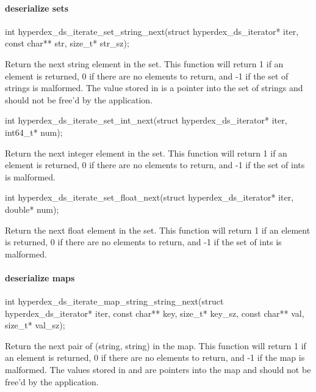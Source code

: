 \paragraph{deserialize sets}

\begin{ccode}
int hyperdex_ds_iterate_set_string_next(struct hyperdex_ds_iterator* iter,
                                        const char** str, size_t* str_sz);
\end{ccode}
\funcdesc Return the next string element in the set.  This function will return
1 if an element is returned, 0 if there are no elements to return, and -1 if the
set of strings is malformed.  The value stored in  is a pointer into
the set of strings and should not be free'd by the application.

\funcsep
\begin{ccode}
int hyperdex_ds_iterate_set_int_next(struct hyperdex_ds_iterator* iter, int64_t* num);
\end{ccode}
\funcdesc Return the next integer element in the set.  This function will return
1 if an element is returned, 0 if there are no elements to return, and -1 if the
set of ints is malformed.

\funcsep
\begin{ccode}
int hyperdex_ds_iterate_set_float_next(struct hyperdex_ds_iterator* iter, double* num);
\end{ccode}
\funcdesc Return the next float element in the set.  This function will return 1
if an element is returned, 0 if there are no elements to return, and -1 if the
set of ints is malformed.

\paragraph{deserialize maps}

\begin{ccode}
int hyperdex_ds_iterate_map_string_string_next(struct hyperdex_ds_iterator* iter,
                                               const char** key, size_t* key_sz,
                                               const char** val, size_t* val_sz);
\end{ccode}
\funcdesc Return the next pair of (string, string) in the map.  This function
will return 1 if an element is returned, 0 if there are no elements to return,
and -1 if the map is malformed.  The values stored in  and
 are pointers into the map and should not be free'd by the
application.

